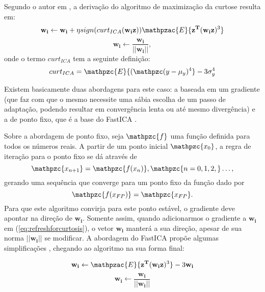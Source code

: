     Segundo o autor em \cite{LuizVictorio}, a derivação do algoritmo de maximização da curtose resulta em:
    \begin{equation}
        \mathbf{w_i} \leftarrow \mathbf{w_i} + \eta  sign(curt_{ICA}(\mathbf{w_iz}))\mathpzac{E}\{\mathbf{z^T}(\mathbf{w_iz})^3\}
        \label{eq:refreshforcurtosis}
    \end{equation}
    \begin{equation}
        \mathbf{w_i} \leftarrow \frac{\mathbf{w_i}}{|| \mathbf{w_i}||},
    \end{equation}
    onde o termo $curt_{ICA}$ tem a seguinte definição:
    \begin{equation}
        curt_{ICA} = \mathpzc{E}\{(\mathpzc(y - \mu_y)^4\} -3\sigma_y^4
    \end{equation}

    Existem basicamente duas abordagens para este caso: a baseada em um gradiente (que faz com que o mesmo necessite uma sábia escolha de um passo de adaptação, podendo resultar em convergência lenta ou até mesmo divergência) e a de ponto fixo, que é a base do FastICA \cite{fastica1}. 
    
    Sobre a abordagem de ponto fixo, seja $\mathpzc{f}$ uma função definida para todos os números reais. A partir de um ponto inicial $\mathpzc{x_0}$, a regra de iteração para o ponto fixo se dá através de 
    \begin{equation}
        \mathpzc{x_{n+1}} = \mathpzc{f(x_n)}, \mathpzc{n = 0,1,2,}\dots,
    \end{equation}
    gerando uma sequência que converge para um ponto fixo da função dado por
    \begin{equation}
        \mathpzc{f(x_{FP})} = \mathpzc{x_{FP}}.
    \end{equation}
    Para que este algoritmo convirja para este ponto estável, o gradiente deve apontar na direção de $\mathbf{w_i}$. Somente assim, quando adicionarmos o gradiente a $\mathbf{w_i}$ em (\ref{eq:refreshforcurtosis}), o vetor $\mathbf{w_i}$ manterá a sua direção, apesar de sua norma $\mathbf{||w_i||}$ se modificar. A abordagem do FastICA propõe algumas simplificações \cite{fastica1}, chegando ao algoritmo na sua forma final:
    
    \begin{equation}
        \mathbf{w_i} \leftarrow \mathpzac{E}\{\mathbf{z^T}(\mathbf{w_iz})^3\} - 3\mathbf{w_i}
        \label{eq:ICAcurtosis}
    \end{equation}
     \begin{equation}
        \mathbf{w_i} \leftarrow \frac{\mathbf{w_i}}{||\mathbf{w_i}||}
        \label{eq:ICAcurtosismodulate}
    \end{equation}

